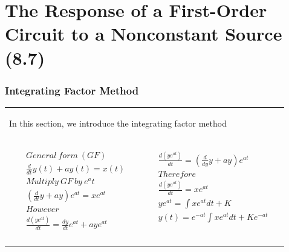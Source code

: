 \documentclass[aspectratio=169]{beamer}
\begin{document}
\section{The Response of a First-Order Circuit to a Nonconstant Source (8.7)}
\begin{frame}[fragile]
	\frametitle{Integrating Factor Method}

    		\begin{tabular}{ll}		
    		\begin{columns}
		\begin{column}{1\textwidth}  %
 In this section, we introduce the integrating factor method
		\end{column}
	        \end{columns}\\	
	\begin{columns}
	  \begin{column}{.4\textwidth}  %
		\begin{eqnarray}
		&&General \ form \ (GF) \nonumber\\
		&&\frac{d}{dt}y(t)+ay(t)=x(t) \nonumber \\
		&&Multiply \ GF \ by\ e^at \nonumber\\ 
		&&( \frac{d}{dt}y+ay )e^{at}=xe^{at} \nonumber \\  
		&&However \nonumber\\
		&&\frac{d(ye^{at})}{dt}=\frac{dy}{dt}e^{at}+aye^{at} \nonumber \\
		 \nonumber	
		 \end{eqnarray}
	  \end{column}
	  \begin{column}{.7\textwidth}  %
		\begin{eqnarray}
		&&\frac{d(ye^{at})}{dt}=(\frac{d}{dy}y+ay)e^{at} \nonumber \\ 
		&&Therefore \nonumber\\
		&&\frac{d(ye^{at})}{dt}=xe^{at} \nonumber \\
		&&ye^{at}= \int xe^{at}dt+K \nonumber \\
		&&y(t)=e^{-at} \int xe^{at}dt+Ke^{-at} 	
		 \end{eqnarray}


	  \end{column}
	\end{columns}
\end{tabular}	

\end{frame}
\end{document}
